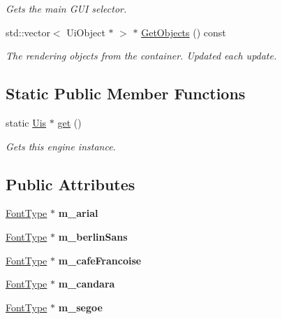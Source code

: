 \begin{DoxyCompactItemize}
\begin{DoxyCompactList}\small\item\em Gets the main G\+UI selector. \end{DoxyCompactList}\item 
std\+::vector$<$ Ui\+Object $\ast$ $>$ $\ast$ \hyperlink{class_flounder_1_1_uis_aa70e4674ef72303797b75b096deb86bc}{Get\+Objects} () const
\begin{DoxyCompactList}\small\item\em The rendering objects from the container. Updated each update. \end{DoxyCompactList}\end{DoxyCompactItemize}
\subsection*{Static Public Member Functions}
\begin{DoxyCompactItemize}
\item 
static \hyperlink{class_flounder_1_1_uis}{Uis} $\ast$ \hyperlink{class_flounder_1_1_uis_a39f0bcd8df0227164cd422e678cc8a58}{get} ()
\begin{DoxyCompactList}\small\item\em Gets this engine instance. \end{DoxyCompactList}\end{DoxyCompactItemize}
\subsection*{Public Attributes}
\begin{DoxyCompactItemize}
\item 
\mbox{\label{class_flounder_1_1_uis_ad182eb0ba968322a9da0651f33b77347}} 
\hyperlink{class_flounder_1_1_font_type}{Font\+Type} $\ast$ {\bfseries m\+\_\+arial}
\item 
\mbox{\label{class_flounder_1_1_uis_a17a6980532a7ac35eae4268f584cd840}} 
\hyperlink{class_flounder_1_1_font_type}{Font\+Type} $\ast$ {\bfseries m\+\_\+berlin\+Sans}
\item 
\mbox{\label{class_flounder_1_1_uis_a802702393b73a62975a09adecc14e435}} 
\hyperlink{class_flounder_1_1_font_type}{Font\+Type} $\ast$ {\bfseries m\+\_\+cafe\+Francoise}
\item 
\mbox{\label{class_flounder_1_1_uis_a954a4578a5e537fe4cb8e2376c2a37e5}} 
\hyperlink{class_flounder_1_1_font_type}{Font\+Type} $\ast$ {\bfseries m\+\_\+candara}
\item 
\mbox{\label{class_flounder_1_1_uis_a8c62abcdf40bcfcd2819ab367219bf06}} 
\hyperlink{class_flounder_1_1_font_type}{Font\+Type} $\ast$ {\bfseries m\+\_\+segoe}
\end{DoxyCompactItemize}
